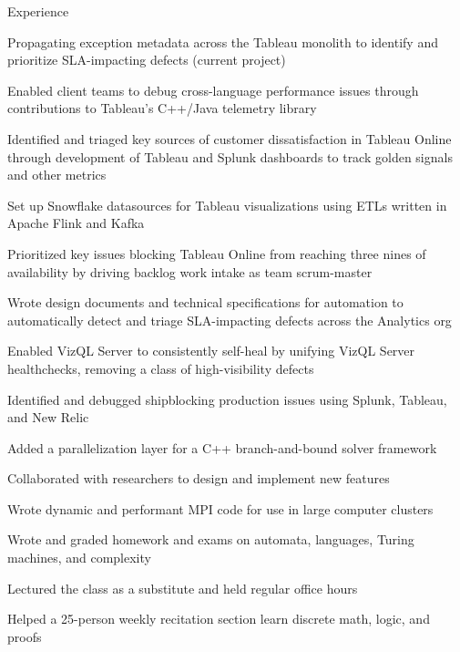 \documentclass{cv}
\begin{document}

\begin{cvsection}{Experience}
  {
    \item Propagating exception metadata across the Tableau monolith to identify and prioritize SLA-impacting defects (current project)
    \item Enabled client teams to debug cross-language performance issues through contributions to Tableau's C++/Java telemetry library
    \item Identified and triaged key sources of customer dissatisfaction in Tableau Online through development of Tableau and Splunk dashboards to track golden signals and other metrics
    \item Set up Snowflake datasources for Tableau visualizations using ETLs written in Apache Flink and Kafka
    \item Prioritized key issues blocking Tableau Online from reaching three nines of availability by driving backlog work intake as team scrum-master
    \item Wrote design documents and technical specifications for automation to automatically detect and triage SLA-impacting defects across the Analytics org
    \item Enabled VizQL Server to consistently self-heal by unifying VizQL Server healthchecks, removing a class of high-visibility defects
    \item Identified and debugged shipblocking production issues using Splunk, Tableau, and New Relic
  }
  {
    \item Added a parallelization layer for a C++ branch-and-bound solver framework
    \item Collaborated with researchers to design and implement new features
    \item Wrote dynamic and performant MPI code for use in large computer clusters
  }
  {
    \item Wrote and graded homework and exams on automata, languages, Turing machines, and complexity
    \item Lectured the class as a substitute and held regular office hours
  }
  {
    \item Helped a 25-person weekly recitation section learn discrete math, logic, and proofs
  }
\end{cvsection}
\end{document}
